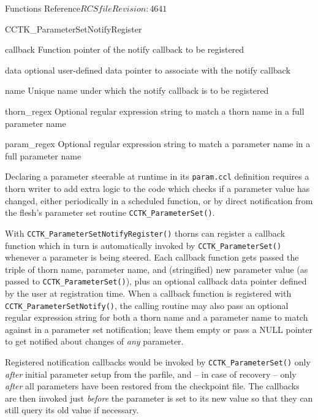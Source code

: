 \begin{cactuspart}{ Functions Reference}{$RCSfile$}{$Revision: 4641 $}
\begin{FunctionDescription}{CCTK\_ParameterSetNotifyRegister}
\begin{ParameterSection}
\begin{Parameter}{callback}
Function pointer of the notify callback to be registered
\end{Parameter}
\begin{Parameter}{data}
optional user-defined data pointer to associate with the notify callback
\end{Parameter}
\begin{Parameter}{name}
Unique name under which the notify callback is to be registered
\end{Parameter}
\begin{Parameter}{thorn\_regex}
Optional regular expression string to match a thorn name in a full parameter name
\end{Parameter}
\begin{Parameter}{param\_regex}
Optional regular expression string to match a parameter name in a full parameter name
\end{Parameter}
\end{ParameterSection}

\begin{Discussion}
Declaring a parameter steerable at runtime in its {\tt param.ccl} definition
requires a thorn writer to add extra logic to the code which checks
if a parameter value has changed, either periodically in a scheduled function,
or by direct notification from the flesh's parameter set routine
{\tt CCTK\_ParameterSet()}.

With {\tt CCTK\_ParameterSetNotifyRegister()} thorns can register a callback
function which in turn is automatically invoked by {\tt CCTK\_ParameterSet()}
whenever a parameter is being steered. 
Each callback function gets passed the triple of thorn name, parameter 
name, and (stringified) new parameter value (as passed to 
{\tt CCTK\_ParameterSet()}), plus an optional callback data pointer defined by 
the user at registration time. When a callback function is registered 
with {\tt CCTK\_ParameterSetNotify()}, the calling routine may also pass an 
optional regular expression string for both a thorn name and a parameter 
name to match against in a parameter set notification; leave them empty 
or pass a NULL pointer to get notified about changes of {\em any} parameter.

Registered notification callbacks would be invoked by 
{\tt CCTK\_ParameterSet()} only {\em after} initial parameter setup from the 
parfile, and -- in case of recovery -- only {\em after} all parameters have 
been restored from the checkpoint file. The callbacks are then invoked 
just {\em before} the parameter is set to its new value so that they can 
still query its old value if necessary.
\end{Discussion}


\end{FunctionDescription}
\end{cactuspart}

